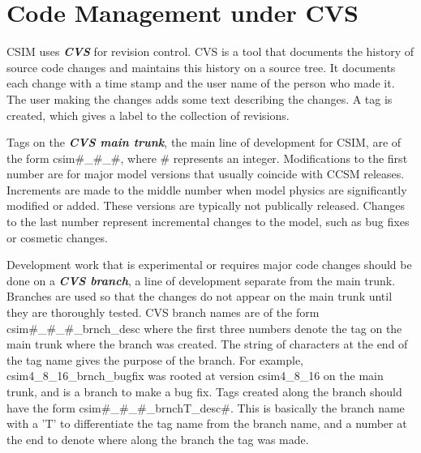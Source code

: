 
\section{Code Management under CVS}

CSIM uses {\bf \textsl{CVS}} for revision control.  CVS is a tool that documents the
history of source code changes and maintains this history on a source tree.  It documents
each change with a time stamp and the user name of the person who made it.  The
user making the changes adds some text describing the changes.  A tag is created,
which gives a label to the collection of revisions.

Tags on the {\bf \textsl{CVS main trunk}}, the main line of development for CSIM, are of the
form csim\#\_\#\_\#, where \# represents an integer.  
Modifications to the first number are for major model versions that usually coincide
with CCSM releases.  Increments are made to the middle number when model physics are
significantly modified or added.  These versions are typically not publically released.
Changes to the last number represent incremental changes to the model, such as bug fixes
or cosmetic changes.

Development work that is experimental or requires major code changes should be done
on a {\bf \textsl{CVS branch}}, a line of development separate from the main trunk. Branches
are used so that the changes do not appear on the main trunk until they
are thoroughly tested.  CVS branch names are of the form csim\#\_\#\_\#\_brnch\_desc
where the first three numbers denote the tag on the main trunk where the branch was
created.  The string of characters at the end of the tag name gives the purpose of the
branch. For example, csim4\_8\_16\_brnch\_bugfix was rooted at version csim4\_8\_16 on
the main trunk, and is a branch to make a bug fix.  Tags created along the branch should
have the form csim\#\_\#\_\#\_brnchT\_desc\#.  This is basically the branch name with a
'T' to differentiate the tag name from the branch name, and a number at the end to 
denote where along the branch the tag was made.
